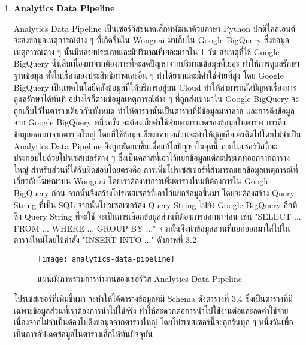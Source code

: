 \begin{enumerate}
	\item \textbf{Analytics Data Pipeline}
	
	Analytics Data Pipeline เป็นเซอร์วิสขนาดเล็กที่พัฒนาด้วยภาษา Python ปกติไคลเอนต์จะส่งข้อมูลเหตุการณ์ต่าง ๆ ที่เกิดขึ้นใน Wongnai มาเก็บใน Google BigQuery ซึ่งข้อมูลเหตุการณ์ต่าง ๆ นั้นมีหลายประเภทและมีปริมาณที่เยอะมากใน 1 วัน สาเหตุที่ใช้ Google BigQuery นั้นสืบเนื่องมาจากต้องการที่จะลดปัญหาจากปริมาณข้อมูลที่เยอะ ทำให้การดูแลรักษาฐานข้อมูล ทั้งในเรื่องของประสิทธิภาพและอื่น ๆ ทำได้ยากและมีค่าใช้จ่ายที่สูง โดย Google BigQuery เป็นเทคโนโลยีคลังข้อมูลที่ให้บริการอยู่บน Cloud ทำให้สามารถตัดปัญหาเรื่องการดูแลรักษาได้ทันที อย่างไรก็ตามข้อมูลเหตุการณ์ต่าง ๆ ที่ถูกส่งเข้ามาใน Google BigQuery จะถูกเก็บไว้ในตารางเดียวกันทั้งหมด ทำให้ตารางนั้นเป็นตารางที่มีข้อมูลมหาศาล และการดึงข้อมูลจาก Google BigQuery หนึ่งครั้ง จะต้องเสียค่าใช้จ่ายตามขนาดของข้อมูลในตาราง การดึงข้อมูลออกมาจากตารางใหญ่ โดยที่ใช้ข้อมูลเพียงแค่บางส่วนจะทำให้สูญเสียเครดิตไปโดยไม่จำเป็น Analytics Data Pipeline จึงถูกพัฒนาขึ้นเพื่อแก้ไขปัญหาในจุดนี้ ภายในเซอร์วิสนี้จะประกอบไปด้วยโปรเซสเซอร์ต่าง ๆ ซึ่งเป็นคลาสที่เอาไว้แยกข้อมูลแต่ละประเภทออกจากตารางใหญ่ สำหรับส่วนที่ได้รับผิดชอบโดยตรงคือ การเพิ่มโปรเซสเซอร์ที่สามารถแยกข้อมูลเหตุการณ์ที่เกี่ยวกับโฆษณาบน Wongnai โดยเราต้องทำการเพิ่มตารางใหม่ที่ต้องการใน Google BigQuery ก่อน จากนั้นจึงสร้างโปรเซสเซอร์ที่เอาไว้แยกข้อมูลขึ้นมา โดยจะต้องสร้าง Query String ที่เป็น SQL จากนั้นโปรเซสเซอร์ส่ง Query String ไปยัง Google BigQuery อีกที ซึ่ง Query String ที่จะใช้ จะเป็นการเลือกข้อมูลส่วนที่ต้องการออกมาก่อน เช่น "SELECT ... FROM ... WHERE ... GROUP BY ..." จากนั้นจึงนำข้อมูลส่วนที่แยกออกมาใส่ไปในตารางใหม่โดยใช้คำสั่ง "INSERT INTO ..." ดังภาพที่ 3.2
	
	\begin{figure}[!h]
		\centering
		\texttt{[image: analytics-data-pipeline]}  
		\caption{แผนผังภาพรวมการทำงานของเซอร์วิส Analytics Data Pipeline}
		\label{Fig:analytics-data-pipeline}
	\end{figure}
	
	โปรเซสเซอร์ที่เพิ่มขึ้นมา จะทำให้ได้ตารางข้อมูลที่มี Schema ดังตารางที่ 3.4 ซึ่งเป็นตารางที่มีเฉพาะข้อมูลส่วนที่เราต้องการนำไปใช้จริง ทำให้สะดวกต่อการนำไปใช้งานต่อและลดค่าใช้จ่ายเนื่องจากไม่จำเป็นต้องไปดึงข้อมูลจากตารางใหญ่ โดยโปรเซสเซอร์นี้จะถูกรันทุก ๆ หนึ่งวันเพื่อเป็นการอัปเดตข้อมูลในตารางเล็กให้ทันปัจจุบัน
	

\end{enumerate}
